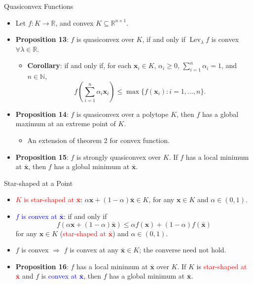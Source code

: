 \documentclass[aspectratio=169,hyperref,UTF8,CJK]{beamer}
\newcommand{\R}{\mathbb{R}}
\newcommand{\vect}[1]{\boldsymbol{#1}}
\begin{document}
\begin{frame}{Quasiconvex Functions}
  \scriptsize
  \begin{itemize}
    \item[$\star$] Let $f:K\to\R$, and convex $K\subseteq\R^{n\times1}$.
    \item \textbf{Proposition 13}: $f$ is quasiconvex over $K$, if and only if $\operatorname{Lev}_{\lambda}f$ is convex $\forall\lambda\in\R$.
      \begin{itemize}
        \item \textbf{Corollary}: if and only if, for each $\vect{x}_i\in K$, $\alpha_i\ge0$, $\sum_{i=1}^{n}\alpha_i=1$, and $n\in\mathbb{N}$,
          \begin{equation*}
            f\left(\sum_{i=1}^{n}\alpha_i\vect{x}_i\right)
            \le\max\{f(\vect{x}_i):i=1,\ldots,n\}.
          \end{equation*}
      \end{itemize}
    \item \textbf{Proposition 14}: $f$ is quasiconvex over a polytope $K$, then $f$ has a global maximum at an extreme point of $K$.
      \begin{itemize}
        \item An extension of theorem 2 for convex function.
      \end{itemize}
    \item \textbf{Proposition 15}: $f$ is strongly quasiconvex over $K$. If $f$ has a local minimum at $\bar{\vect{x}}$, then $f$ has a global minimum at $\bar{\vect{x}}$.
  \end{itemize}
\end{frame}

\begin{frame}{Star-shaped at a Point}
  \small
  \begin{itemize}
    \item \textcolor{red}{$K$ is star-shaped at $\bar{\vect{x}}$}: $\alpha\vect{x}+(1-\alpha)\bar{\vect{x}}\in K$, for any $\vect{x}\in K$ and $\alpha\in(0,1)$.
    \item \textcolor{blue}{$f$ is convex at $\bar{\vect{x}}$}: if and only if
      \begin{equation*}
        f(\alpha\vect{x}+(1-\alpha)\bar{\vect{x}})
        \le\alpha f(\vect{x})+(1-\alpha)f(\bar{\vect{x}})
      \end{equation*}
      for any $\vect{x}\in K$ (\textcolor{red}{star-shaped at $\bar{\vect{x}}$}) and $\alpha\in(0,1)$.
    \item $f$ is convex $\Longrightarrow$ $f$ is convex at any $\bar{\vect{x}}\in K$; the converse need not hold.
    \item \textbf{Proposition 16}: $f$ has a local minimum at $\bar{\vect{x}}$ over $K$. If $K$ is \textcolor{red}{star-shaped at $\bar{\vect{x}}$} and $f$ is \textcolor{blue}{convex at $\bar{\vect{x}}$}, then $f$ has a global minimum at $\bar{\vect{x}}$.
  \end{itemize}
\end{frame}
\end{document}
